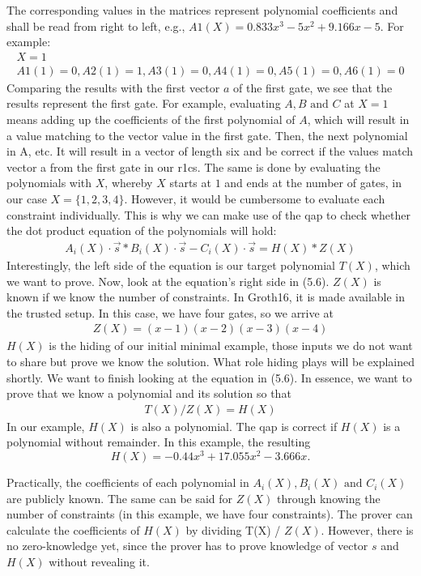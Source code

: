 The corresponding values in the matrices represent polynomial coefficients and shall be read from right to left, e.g., \(A1(X) = 0.833x^3 - 5x^2 + 9.166x -5\). For example:
\begin{align}
     X = 1 \\
    A1(1) = 0, A2(1) = 1, A3(1) = 0, A4(1) = 0, A5(1) = 0, A6(1) = 0
\end{align}
Comparing the results with the first vector \(a\) of the first gate, we see that the results represent the first gate.
For example, evaluating \(A, B \text{ and }C\) at \(X = 1\) means adding up the coefficients of the first polynomial of \(A\), which will result in a value matching to the vector value in the first gate. Then, the next polynomial in A, etc. It will result in a vector of length six and be correct if the values match vector a from the first gate in our \acrshort{r1cs}. The same is done by evaluating the polynomials with \(X\), whereby \(X\) starts at \(1\) and ends at the number of gates, in our case \(X=\{1,2,3,4\}\).
However, it would be cumbersome to evaluate each constraint individually. This is why we can make use of the \acrshort{qap} to check whether the dot product equation of the polynomials will hold:
\begin{align}
    A_i(X)\cdot \Vec{s} * B_i(X)\cdot \Vec{s} - C_i(X)\cdot \Vec{s} = H(X) * Z(X)
\end{align}
Interestingly, the left side of the equation is our target polynomial \(T(X)\), which we want to prove.
Now, look at the equation's right side in (5.6). \(Z(X)\) is known if we know the number of constraints. In Groth16, it is made available in the trusted setup. In this case, we have four gates, so we arrive at
\begin{align}
    Z(X) = (x-1)(x-2)(x-3)(x-4)
\end{align}
\(H(X)\) is the hiding of our initial minimal example, those inputs we do not want to share but prove we know the solution. What role hiding plays will be explained shortly. We want to finish looking at the equation in (5.6). In essence, we want to prove that we know a polynomial and its solution so that
\begin{align}
    T(X) / Z(X) = H(X)
\end{align}
In our example, \(H(X)\) is also a polynomial. The \acrshort{qap} is correct if \(H(X)\) is a polynomial without remainder. In this example, the resulting
\[H(X) = -0.44x^3 + 17.055x^2 - 3.666x.\]

Practically, the coefficients of each polynomial in \(A_i(X), B_i(X) \text{ and }C_i(X)\) are publicly known. The same can be said for \(Z(X)\) through knowing the number of constraints (in this example, we have four constraints). The prover can calculate the coefficients of \(H(X)\) by dividing T(X) / \(Z(X)\). However, there is no zero-knowledge yet, since the prover has to prove knowledge of vector \(s\) and \(H(X)\) without revealing it.
\newpage

